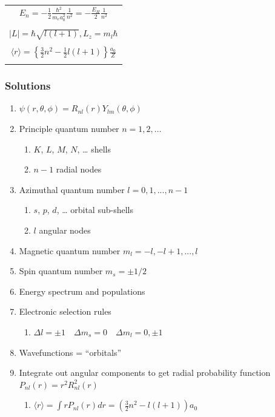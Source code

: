 \documentclass[11pt]{article}
\begin{document}
\begin{table}[]
\begin{center}
\begin{tabular}[h]{|c|}
\\
$\displaystyle     E_{n}=-\frac{1}{2}\frac{\hbar^2}{m_e a_0^2}\frac{1}{n^2} =-\frac{E_H}{2}\frac{1}{n^2}$ \\
 \\
$\displaystyle |L| = \hbar \sqrt{l(l+1)}, L_z = m_l \hbar $ \\
\\
$\displaystyle \langle r \rangle = \left \{ \frac{3}{2} n^2 - \frac{1}{2} l(l+1) \right \} \frac{a_0}{Z} $ \\
\\
\hline
\end{tabular}
 \end{center}
\end{table}

\subsubsection{Solutions}
\label{sec:orge57444e}
\begin{enumerate}
\item \(\psi(r,\theta,\phi)=R_{nl}(r)Y_{lm}(\theta,\phi)\)
\item Principle quantum number \(n=1,2,\ldots\)
\begin{enumerate}
\item \(K\), \(L\), \(M\), \(N\), \ldots{} shells
\item \(n-1\) radial nodes
\end{enumerate}
\item Azimuthal quantum number \(l=0,1,...,n-1\)
\begin{enumerate}
\item \(s\), \(p\), \(d\), \ldots{} orbital sub-shells
\item \(l\) angular nodes
\end{enumerate}
\item Magnetic quantum number \(m_l=-l,-l+1,...,l\)
\item Spin quantum number \(m_s=\pm 1/2\)
\item Energy spectrum and populations
\item Electronic selection rules
\begin{enumerate}
\item \(\Delta l=\pm 1 \quad \Delta m_s =0 \quad \Delta m_l = 0,\pm 1\)
\end{enumerate}
\item Wavefunctions = ``orbitals''
\item Integrate out angular components to get radial probability function \(P_{nl}(r)=r^2 R_{nl}^2(r)\)
\begin{enumerate}
\item \(\langle r\rangle = \int r P_{nl}(r) dr = \left(\frac{3}{2}n^2-l(l+1)\right)a_0\)
\end{enumerate}
\end{enumerate}
\end{document}
